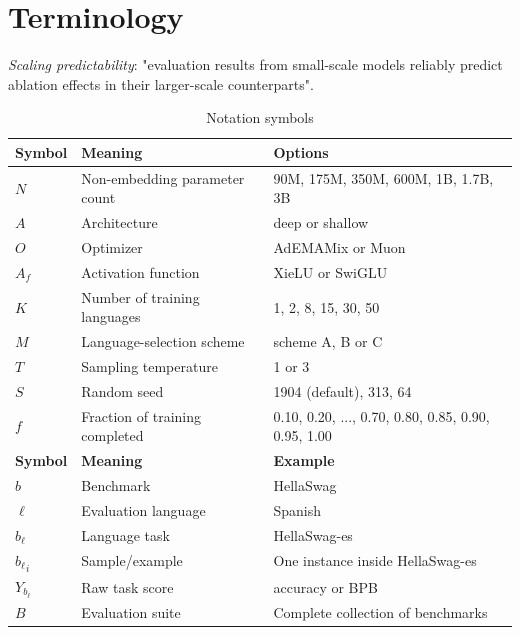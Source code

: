 \section{Terminology}

\textit{Scaling predictability}: "evaluation results from small-scale models reliably predict ablation effects in their larger-scale counterparts".


\begin{table}[th]
    \centering
    \begin{tabular}{lll}
        \toprule
        \textbf{Symbol} & \textbf{Meaning} & \textbf{Options} \\
        \hline
        \(N\) & Non-embedding parameter count & 90M, 175M, 350M, 600M, 1B, 1.7B, 3B \\
        \hline
        \(A\) & Architecture & deep or shallow \\
        \hline
        \(O\) & Optimizer & AdEMAMix or Muon \\
        \hline
        \(A_f\) & Activation function & XieLU or SwiGLU \\
        \hline
        \(K\) & Number of training languages & 1, 2, 8, 15, 30, 50 \\
        \hline
        \(M\) & Language-selection scheme & scheme A, B or C \\
        \hline
        \(T\) & Sampling temperature & 1 or 3 \\
        \hline
        \(S\) & Random seed & 1904 (default), 313, 64 \\
        \hline
        \(f\) & Fraction of training completed & 0.10, 0.20, ..., 0.70, 0.80, 0.85, 0.90, 0.95, 1.00 \\
        \bottomrule
        \toprule
        \textbf{Symbol} & \textbf{Meaning} & \textbf{Example} \\
        \hline
        \(b\) & Benchmark & HellaSwag \\
        \hline
        \(\ell\) & Evaluation language & Spanish \\
        \hline
        \(b_\ell\) & Language task & HellaSwag-es \\
        \hline
        \({b_\ell}_i\) & Sample/example & One instance inside HellaSwag-es \\
        \hline
        \(Y_{b_\ell}\) & Raw task score & accuracy or BPB \\
        \hline
        \(B\) & Evaluation suite & Complete collection of benchmarks \\
        \bottomrule
    \end{tabular}
    \caption{Notation symbols}
    \label{tab:notation-symbols}
\end{table}

